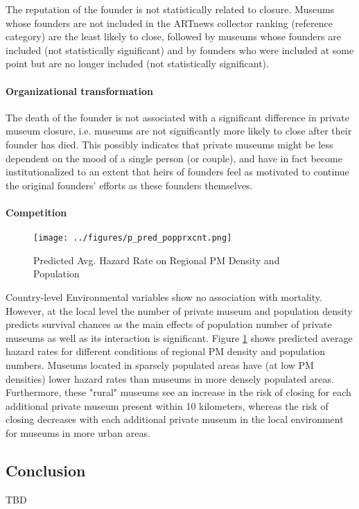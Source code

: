 \documentclass[12pt]{article}
\begin{document}
The reputation of the founder is not statistically related to closure. 
Museums whose founders are not included in the ARTnews collector ranking (reference category) are the least likely to close, followed by museums whose founders are included (not statistically significant) and by founders who were included at some point but are no longer included (not statistically significant).

\paragraph*{Organizational transformation}
\label{sec:orge8aaa4f}

The death of the founder is not associated with a significant difference in private museum closure, i.e. museums are not significantly more likely to close after their founder has died.
This possibly indicates that private museums might be less dependent on the mood of a single person (or couple), and have in fact become institutionalized to an extent that heirs of founders feel as motivated to continue the original founders' efforts as these founders themselves.

\paragraph*{Competition}
\label{sec:orgd4359d4}
\begin{figure}[htbp]
\centering
\texttt{[image: ../figures/p\_pred\_popprxcnt.png]}
\caption{\label{fig:p_pred_popprxcnt}Predicted Avg. Hazard Rate on Regional PM Density and Population}
\end{figure}



Country-level Environmental variables show no association with mortality.
However, at the local level the number of private museum and population density predicts survival chances as the main effects of population number of private museums as well as its interaction is significant.
Figure \ref{fig:p_pred_popprxcnt} shows predicted average hazard rates for different conditions of regional PM density and population numbers.
Museums located in sparsely populated areas have (at low PM densities) lower hazard rates than museums in more densely populated areas. 
Furthermore, these "rural" museums see an increase in the risk of closing for each additional private museum present within 10 kilometers, whereas the risk of closing decreases with  each additional private museum in the local environment for museums in more urban areas. 


\subsection*{Conclusion}
\label{sec:org77289d2}
TBD




\begin{sloppypar}
\printbibliography
\end{sloppypar}
\end{document}

